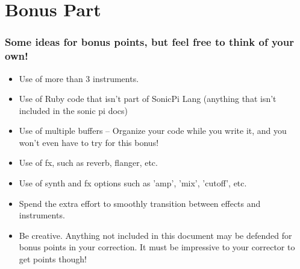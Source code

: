 \documentclass{42-en}
\begin{document}
\chapter{Bonus Part}
	\subsection{Some ideas for bonus points, but feel free to think of your own!}
		\begin{itemize}\itemsep1pt
			\item Use of more than 3 instruments.
			\item Use of Ruby code that isn't part of SonicPi Lang (anything that isn't included in the sonic pi docs)
			\item Use of multiple buffers -- Organize your code while you write it, and you won't even have to try for this bonus!
			\item Use of fx, such as reverb, flanger, etc.
			\item Use of synth and fx options such as 'amp', 'mix', 'cutoff', etc.
			\item Spend the extra effort to smoothly transition between effects and instruments.
			\item Be creative. Anything not included in this document may be defended for bonus points in your correction. It must be impressive to your corrector to get points though!
		\end{itemize}
\end{document}

